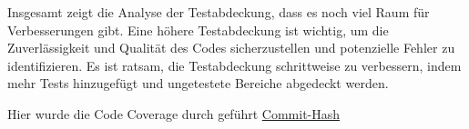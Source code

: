 Insgesamt zeigt die Analyse der Testabdeckung, dass es noch viel Raum für Verbesserungen gibt. Eine höhere Testabdeckung ist wichtig, um die Zuverlässigkeit und Qualität des Codes sicherzustellen und potenzielle Fehler zu identifizieren. Es ist ratsam, die Testabdeckung schrittweise zu verbessern, indem mehr Tests hinzugefügt und ungetestete Bereiche abgedeckt werden.

Hier wurde die Code Coverage durch geführt \href{https://github.com/lorenz1702/Spy-Game/commit/735b2712fbacca8f45f3a4fd820081cb8efeea14}{Commit-Hash}

